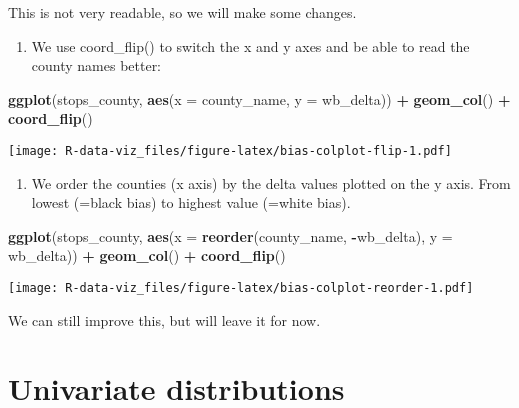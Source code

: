 \documentclass[]{book}
\newenvironment{Shaded}{\begin{snugshade}}{\end{snugshade}}
\newcommand{\KeywordTok}[1]{\textcolor[rgb]{0.13,0.29,0.53}{\textbf{#1}}}
\newcommand{\DataTypeTok}[1]{\textcolor[rgb]{0.13,0.29,0.53}{#1}}
\newcommand{\StringTok}[1]{\textcolor[rgb]{0.31,0.60,0.02}{#1}}
\newcommand{\OperatorTok}[1]{\textcolor[rgb]{0.81,0.36,0.00}{\textbf{#1}}}
\newcommand{\NormalTok}[1]{#1}
\providecommand{\tightlist}{%
  \setlength{\itemsep}{0pt}\setlength{\parskip}{0pt}}
\theoremstyle{definition}
\theoremstyle{definition}
\theoremstyle{definition}
\theoremstyle{remark}
\begin{document}
This is not very readable, so we will make some changes.

\begin{enumerate}
\def\labelenumi{\arabic{enumi}.}
\tightlist
\item
  We use coord\_flip() to switch the x and y axes and be able to read
  the county names better:
\end{enumerate}

\begin{Shaded}
\begin{Highlighting}[]
\KeywordTok{ggplot}\NormalTok{(stops_county, }\KeywordTok{aes}\NormalTok{(}\DataTypeTok{x =}\NormalTok{ county_name, }\DataTypeTok{y =}\NormalTok{ wb_delta)) }\OperatorTok{+}
\StringTok{  }\KeywordTok{geom_col}\NormalTok{() }\OperatorTok{+}\StringTok{ }
\StringTok{  }\KeywordTok{coord_flip}\NormalTok{()}
\end{Highlighting}
\end{Shaded}

\texttt{[image: R-data-viz\_files/figure-latex/bias-colplot-flip-1.pdf]}

\begin{enumerate}
\def\labelenumi{\arabic{enumi}.}
\setcounter{enumi}{1}
\tightlist
\item
  We order the counties (x axis) by the delta values plotted on the y
  axis. From lowest (=black bias) to highest value (=white bias).
\end{enumerate}

\begin{Shaded}
\begin{Highlighting}[]
\KeywordTok{ggplot}\NormalTok{(stops_county, }\KeywordTok{aes}\NormalTok{(}\DataTypeTok{x =} \KeywordTok{reorder}\NormalTok{(county_name, }\OperatorTok{-}\NormalTok{wb_delta), }\DataTypeTok{y =}\NormalTok{ wb_delta)) }\OperatorTok{+}
\StringTok{  }\KeywordTok{geom_col}\NormalTok{() }\OperatorTok{+}\StringTok{ }
\StringTok{  }\KeywordTok{coord_flip}\NormalTok{()}
\end{Highlighting}
\end{Shaded}

\texttt{[image: R-data-viz\_files/figure-latex/bias-colplot-reorder-1.pdf]}

We can still improve this, but will leave it for now.

\section{Univariate distributions}\label{univariate-distributions}
\end{document}
